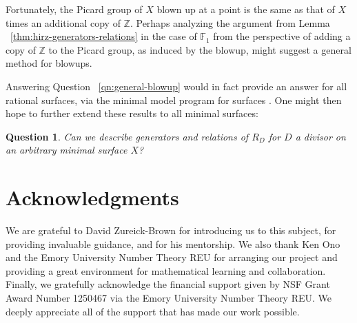 \documentclass{amsart}
\theoremstyle{plain}
\newtheorem{question}[thm]{Question}
\theoremstyle{definition}
\theoremstyle{remark}
\numberwithin{equation}{section}
\newcommand\bz{{\mathbb Z}}
\newcommand\hirz{\mathbb{F}}
\begin{document}
Fortunately, the Picard group of $X$ blown up at a point is the same as that of
$X$ times an additional copy of $\bz$.  Perhaps analyzing the argument from
Lemma ~\ref{thm:hirz-generators-relations} in the case of $\hirz_1$ from the
perspective of adding a copy of $\mathbb{Z}$ to the Picard group, as induced by
the blowup, might suggest a general method for blowups.

Answering Question ~\ref{qn:general-blowup} would in fact provide an answer for
all rational surfaces, via the minimal model program for surfaces
.  One might then hope to further extend these results to all minimal surfaces:
\begin{question}
\label{qn:general-minimal-surface}
Can we describe generators and relations of $R_D$ for $D$ a divisor on an
arbitrary minimal surface $X$?
\end{question}


\section{Acknowledgments}
\label{sec:ack}
We are grateful to David Zureick-Brown for introducing us to this
subject, for providing invaluable guidance,
and for his mentorship. We also thank Ken Ono and the
Emory University Number Theory REU for arranging our project and
providing a great environment for mathematical learning and
collaboration.
Finally, we gratefully acknowledge the financial support given by
NSF Grant Award Number 1250467 via the Emory University Number
Theory REU. We deeply appreciate all of the support that has made
our work possible.


\nocite{*}
{}

\end{document}
